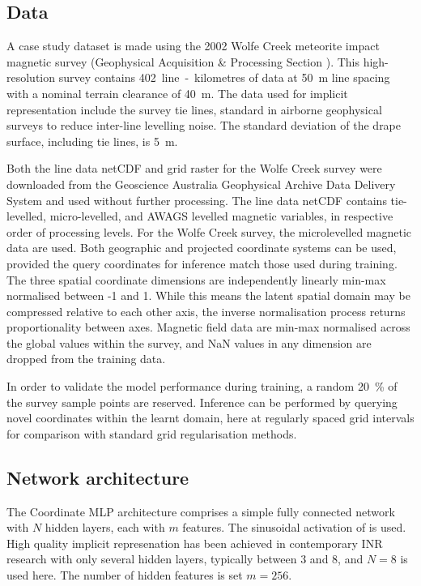 \documentclass[manuscript.tex]{subfiles}
\begin{document}
\subsection{Data}
A case study dataset is made using the 2002 Wolfe Creek meteorite impact magnetic survey (Geophysical Acquisition \& Processing Section \cite*{wolfecreek2019}).
This high-resolution survey contains \SI{402}{line-kilometres} of data at \SI{50}{\m} line spacing with a nominal terrain clearance of \SI{40}{\m}.
The data used for implicit representation include the survey tie lines, standard in airborne geophysical surveys to reduce inter-line levelling noise.
The standard deviation of the drape surface, including tie lines, is \SI{5}{\m}.

Both the line data netCDF and grid raster for the Wolfe Creek survey were downloaded from the Geoscience Australia Geophysical Archive Data Delivery System and used without further processing.
The line data netCDF contains tie-levelled, micro-levelled, and AWAGS levelled magnetic variables, in respective order of processing levels.
For the Wolfe Creek survey, the microlevelled magnetic data are used.
Both geographic and projected coordinate systems can be used, provided the query coordinates for inference match those used during training.
The three spatial coordinate dimensions are independently linearly min-max normalised between -1 and 1.
While this means the latent spatial domain may be compressed relative to each other axis, the inverse normalisation process returns proportionality between axes.
Magnetic field data are min-max normalised across the global values within the survey, and NaN values in any dimension are dropped from the training data.

In order to validate the model performance during training, a random \qty{20}{\percent} of the survey sample points are reserved.
Inference can be performed by querying novel coordinates within the learnt domain, here at regularly spaced grid intervals for comparison with standard grid regularisation methods.

\subsection{Network architecture}
The Coordinate MLP architecture comprises a simple fully connected network with \(N\) hidden layers, each with \(m\) features.
The sinusoidal activation of \parencite{sitzmann2019siren} is used. %
High quality implicit represenation has been achieved in contemporary INR research with only several hidden layers, typically between 3 and 8, and \(N = 8\) is used here.
The number of hidden features is set \(m = 256\).
\end{document}
